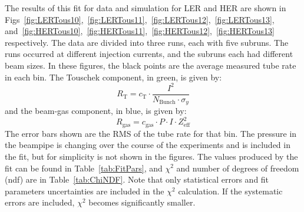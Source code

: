 The results of this fit for data and simulation for LER and HER are shown in Figs~\ref{fig:LERTous10},~\ref{fig:LERTous11},~\ref{fig:LERTous12},~\ref{fig:LERTous13}, and~\ref{fig:HERTous10},~\ref{fig:HERTous11},~\ref{fig:HERTous12},~\ref{fig:HERTous13} respectively. The data are divided into three runs, each with five subruns. The runs occurred at different injection currents, and the subruns each had different beam sizes. In these figures, the black points are the average measured \he tube rate in each bin. The Touschek component, in green, is given by:
\begin{equation}
	R_{\mathrm{T}} = c_{\mathrm{T}}\cdot \frac{I^{2}}{N_{\mathrm{Bunch}}\cdot\sigma_{y}}
\end{equation}
and the beam-gas component, in blue, is given by:
\begin{equation}
	R_{\mathrm{gas}} = c_{\mathrm{gas}}\cdot P\cdot I\cdot Z_{\mathrm{eff}}^{2}
\end{equation}
The error bars shown are the RMS of the \he tube rate for that bin. The pressure in the beampipe is changing over the course of the experiments and is included in the fit, but for simplicity is not shown in the figures. The values produced by the fit can be found in Table~\ref{tab:FitPars}, and $\chi^2$ and number of degrees of freedom (ndf) are in Table~\ref{tab:ChiNDF}. Note that only statistical errors and fit parameters uncertainties are included in the $\chi^2$ calculation. If the systematic errors are included, $\chi^2$ becomes significantly smaller.


